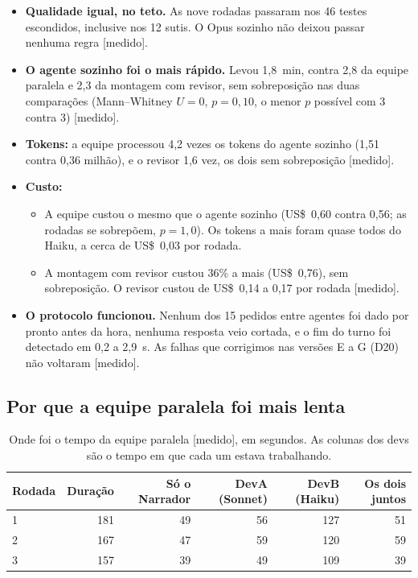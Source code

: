 \documentclass[11pt,a4paper]{article}
\newcommand{\rot}[1]{\textsf{\footnotesize[#1]}}
\begin{document}
\begin{itemize}
  \item \textbf{Qualidade igual, no teto.} As nove rodadas passaram nos 46 testes escondidos, inclusive
    nos 12 sutis. O Opus sozinho não deixou passar nenhuma regra \rot{medido}.
  \item \textbf{O agente sozinho foi o mais rápido.} Levou 1,8~min, contra 2,8 da equipe paralela e 2,3 da
    montagem com revisor, sem sobreposição nas duas comparações (Mann--Whitney $U = 0$, $p = 0{,}10$, o
    menor $p$ possível com 3 contra 3) \rot{medido}.
  \item \textbf{Tokens:} a equipe processou 4,2 vezes os tokens do agente sozinho (1,51 contra 0,36
    milhão), e o revisor 1,6 vez, os dois sem sobreposição \rot{medido}.
  \item \textbf{Custo:}
    \begin{itemize}
      \item A equipe custou o mesmo que o agente sozinho (US\$~0,60 contra 0,56; as rodadas se sobrepõem,
        $p = 1{,}0$). Os tokens a mais foram quase todos do Haiku, a cerca de US\$~0,03 por rodada.
      \item A montagem com revisor custou 36\% a mais (US\$~0,76), sem sobreposição. O revisor custou de
        US\$~0,14 a 0,17 por rodada \rot{medido}.
    \end{itemize}
  \item \textbf{O protocolo funcionou.} Nenhum dos 15 pedidos entre agentes foi dado por pronto antes da
    hora, nenhuma resposta veio cortada, e o fim do turno foi detectado em 0,2 a 2,9~s. As falhas que
    corrigimos nas versões E a G (D20) não voltaram \rot{medido}.
\end{itemize}

\subsection{Por que a equipe paralela foi mais lenta}

\begin{table}[H]
\centering\small
\caption{Onde foi o tempo da equipe paralela \rot{medido}, em segundos. As colunas dos devs são o tempo em que cada um estava trabalhando.}
\begin{tabular}{lrrrrr}
\toprule
Rodada & Duração & Só o Narrador & DevA (Sonnet) & DevB (Haiku) & Os dois juntos \\
\midrule
1 & 181 & 49 & 56 & 127 & 51 \\
2 & 167 & 47 & 59 & 120 & 59 \\
3 & 157 & 39 & 49 & 109 & 39 \\
\bottomrule
\end{tabular}
\end{table}
\end{document}
